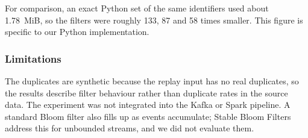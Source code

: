 For comparison, an exact Python set of the same identifiers used about 1.78~MiB,
so the filters were roughly 133, 87 and 58 times smaller. This figure is specific to
our Python implementation.

\subsubsection{Limitations}
The duplicates are synthetic because the replay input has no real duplicates, so
the results describe filter behaviour rather than duplicate rates in the source
data. The experiment was not integrated into the Kafka or Spark pipeline. A standard Bloom filter also fills up as events accumulate; Stable Bloom Filters~\cite{deng2006stable} address this for unbounded streams, and we did not evaluate them.
